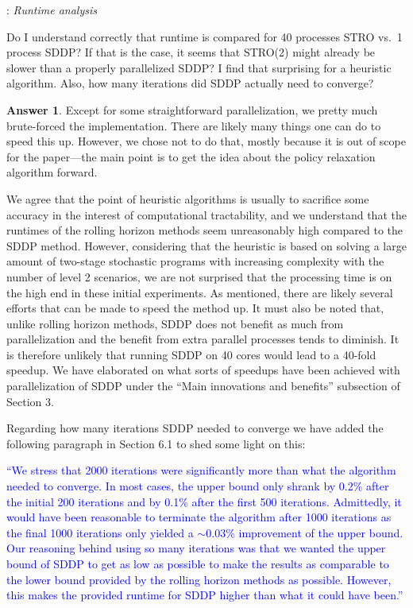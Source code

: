 \documentclass{article}
\theoremstyle{definition}
\newtheorem*{answer}{Answer}
\newcounter{commentCounter}
\newenvironment{comment}{ \vspace{.2cm} \raggedright \color{commentColor}{\bf Reviewer's Comment \arabic{commentCounter}}: }{\addtocounter{commentCounter}{1} \vspace{0.2cm} \color{black}}
\begin{document}
{%
\begin{comment}
\emph{Runtime analysis}

Do I understand correctly that runtime is compared for 40 processes STRO vs.\ 1 process SDDP? If that is the case, it seems that STRO(2) might already be slower than a properly parallelized SDDP? I find that surprising for a heuristic algorithm. Also, how many iterations did SDDP actually need to converge?


\end{comment}

\begin{answer}
    Except for some straightforward parallelization, we pretty much brute-forced the implementation. There are likely many things one can do to speed this up. However, we chose not to do that, mostly because it is out of scope for the paper---the main point is to get the idea about the policy relaxation algorithm forward.

    We agree that the point of heuristic algorithms is usually to sacrifice some accuracy in the interest of computational tractability, and we understand that the runtimes of the rolling horizon methods seem unreasonably high compared to the SDDP method. However, considering that the heuristic is based on solving a large amount of two-stage stochastic programs with increasing complexity with the number of level 2 scenarios, we are not surprised that the processing time is on the high end in these initial experiments. As mentioned, there are likely several efforts that can be made to speed the method up. It must also be noted that, unlike rolling horizon methods, SDDP does not benefit as much from parallelization and the benefit from extra parallel processes tends to diminish. It is therefore unlikely that running SDDP on 40 cores would lead to a 40-fold speedup. We have elaborated on what sorts of speedups have been achieved with parallelization of SDDP under the ``Main innovations and benefits'' subsection of Section 3.

    Regarding how many iterations SDDP needed to converge we have added the following paragraph in Section 6.1 to shed some light on this:

    \textcolor{blue}{``We stress that 2000 iterations were significantly more than what the algorithm needed to converge. In most cases, the upper bound only shrank by 0.2\% after the initial 200 iterations and by 0.1\% after the first 500 iterations. Admittedly, it would have been reasonable to terminate the algorithm after 1000 iterations as the final 1000 iterations only yielded a $\sim 0.03\%$ improvement of the upper bound. Our reasoning behind using so many iterations was that we wanted the upper bound of SDDP to get as low as possible to make the results as comparable to the lower bound provided by the rolling horizon methods as possible. However, this makes the provided runtime for SDDP higher than what it could have been.''}


\end{answer}}
\end{document}
